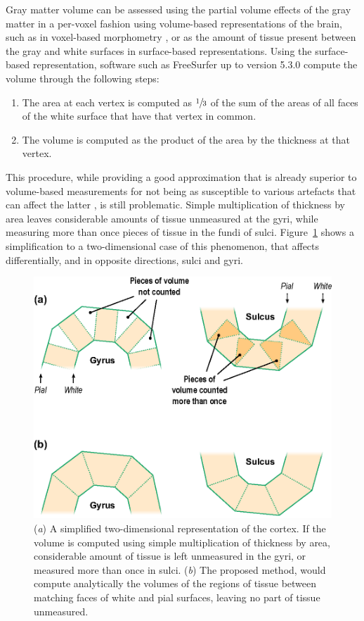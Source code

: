 Gray matter volume can be assessed using the partial volume effects of the gray matter in a per-voxel fashion using volume-based representations of the brain, such as in voxel-based morphometry \citep[\textsc{vbm}][]{Ashburner2000}, or as the amount of tissue present between the gray and white surfaces in surface-based representations. Using the surface-based representation, software such as FreeSurfer up to version 5.3.0 compute the volume through the following steps:

\begin{enumerate}
\item The area at each vertex is computed as $\sfrac{1}{3}$ of the sum of the areas of all faces of the white surface that have that vertex in common. 
\item The volume is computed as the product of the area by the thickness at that vertex.
\end{enumerate}

This procedure, while providing a good approximation that is already superior to volume-based measurements for not being as susceptible to various artefacts that can affect the latter \citep{Ashburner2009}, is still problematic. Simple multiplication of thickness by area leaves considerable amounts of tissue unmeasured at the gyri, while measuring more than once pieces of tissue in the fundi of sulci. Figure~\ref{fig:areal:mantle} shows a simplification to a two-dimensional case of this phenomenon, that affects differentially, and in opposite directions, sulci and gyri.

\begin{figure}[!p]
\centering
\includegraphics{images/mantle.eps}
\caption[Simple multiplication leaves tissue over- or under-represented.]{(\emph{a}) A simplified two-dimensional representation of the cortex. If the volume is computed using simple multiplication of thickness by area, considerable amount of tissue is left unmeasured in the gyri, or measured more than once in sulci. (\emph{b}) The proposed method, would compute analytically the volumes of the regions of tissue between matching faces of white and pial surfaces, leaving no part of tissue unmeasured.}
\label{fig:areal:mantle}
\end{figure}

